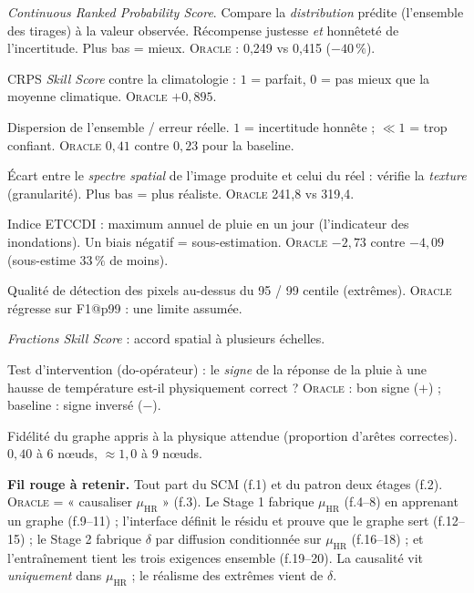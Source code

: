 \documentclass[11pt,a4paper]{article}
\newcommand{\Oracle}{\textsc{Oracle}}
\newcommand{\HR}{\ensuremath{\mathrm{HR}}}
\newcommand{\muHR}{\ensuremath{\mu_{\HR}}}
\begin{document}
\begin{description}[style=nextline,nosep]
  \item[CRPS (mm/j)] \emph{Continuous Ranked Probability Score}. Compare la \emph{distribution} prédite (l'ensemble des tirages) à la valeur observée. Récompense justesse \emph{et} honnêteté de l'incertitude. Plus bas = mieux. \Oracle{} : 0,249 vs 0,415 ($-40\,\%$).
  \item[CRPS-SS] CRPS \emph{Skill Score} contre la climatologie : $1$ = parfait, $0$ = pas mieux que la moyenne climatique. \Oracle{} $+0{,}895$.
  \item[Ratio spread-skill] Dispersion de l'ensemble / erreur réelle. $1$ = incertitude honnête ; $\ll 1$ = trop confiant. \Oracle{} $0{,}41$ contre $0{,}23$ pour la baseline.
  \item[Distance RAPSD] Écart entre le \emph{spectre spatial} de l'image produite et celui du réel : vérifie la \emph{texture} (granularité). Plus bas = plus réaliste. \Oracle{} 241,8 vs 319,4.
  \item[RX1day (mm)] Indice ETCCDI : maximum annuel de pluie en un jour (l'indicateur des inondations). Un biais négatif = sous-estimation. \Oracle{} $-2{,}73$ contre $-4{,}09$ (sous-estime $33\,\%$ de moins).
  \item[F1@p95 / p99] Qualité de détection des pixels au-dessus du 95 / 99 centile (extrêmes). \Oracle{} régresse sur F1@p99 : une limite assumée.
  \item[FSS] \emph{Fractions Skill Score} : accord spatial à plusieurs échelles.
  \item[$Q_{\mathrm{int}}$] Test d'intervention (do-opérateur) : le \emph{signe} de la réponse de la pluie à une hausse de température est-il physiquement correct ? \Oracle{} : bon signe ($+$) ; baseline : signe inversé ($-$).
  \item[$Q_{\mathrm{phys}}$] Fidélité du graphe appris à la physique attendue (proportion d'arêtes correctes). $0{,}40$ à 6 n\oe uds, $\approx 1{,}0$ à 9 n\oe uds.
\end{description}

\vspace{4pt}
\begin{mdframed}[backgroundcolor=grisclair,linecolor=bleu,linewidth=0.6pt,roundcorner=3pt]
\textbf{Fil rouge à retenir.} Tout part du SCM (f.1) et du patron deux étages (f.2). \Oracle{} = « causaliser $\muHR$ » (f.3). Le Stage 1 fabrique $\muHR$ (f.4--8) en apprenant un graphe (f.9--11) ; l'interface définit le résidu et prouve que le graphe sert (f.12--15) ; le Stage 2 fabrique $\delta$ par diffusion conditionnée sur $\muHR$ (f.16--18) ; et l'entraînement tient les trois exigences ensemble (f.19--20). La causalité vit \emph{uniquement} dans $\muHR$ ; le réalisme des extrêmes vient de $\delta$.
\end{mdframed}
\end{document}
